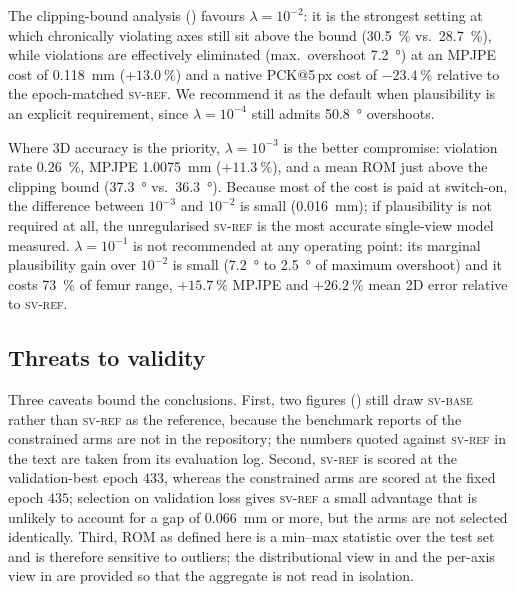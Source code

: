 \documentclass[11pt,a4paper]{article}
\newcommand{\lam}{\lambda}
\newcommand{\armref}{\textsc{sv-ref}}
\newcommand{\armbase}{\textsc{sv-base}}
\begin{document}
The clipping-bound analysis () favours $\lam = 10^{-2}$: it
is the strongest setting at which chronically violating axes still sit above
the bound (\SI{30.5}{\percent} vs.\ \SI{28.7}{\percent}), while violations are
effectively eliminated
(max.\ overshoot \SI{7.2}{\degree}) at an MPJPE cost of
\SI{0.118}{\milli\metre} ($+\SI{13.0}{\percent}$) and a native PCK@5\,px cost
of $-\SI{23.4}{\percent}$ relative to the epoch-matched \armref{}. We recommend
it as the default when plausibility is an explicit requirement, since
$\lam = 10^{-4}$ still admits \SI{50.8}{\degree} overshoots.

Where 3D accuracy is the priority, $\lam = 10^{-3}$ is the better compromise:
violation rate \SI{0.26}{\percent}, MPJPE \SI{1.0075}{\milli\metre}
($+\SI{11.3}{\percent}$), and a mean ROM just above the clipping bound
(\SI{37.3}{\degree} vs.\ \SI{36.3}{\degree}).
Because most of the cost is paid at switch-on, the difference between
$10^{-3}$ and $10^{-2}$ is small (\SI{0.016}{\milli\metre}); if plausibility is
not required at all, the unregularised \armref{} is the most accurate
single-view model measured. $\lam = 10^{-1}$ is not recommended at any
operating point: its marginal plausibility gain over $10^{-2}$ is small
(\SI{7.2}{\degree} to \SI{2.5}{\degree} of maximum overshoot) and it costs
\SI{73}{\percent} of femur range, $+\SI{15.7}{\percent}$ MPJPE and
$+\SI{26.2}{\percent}$ mean 2D error relative to \armref{}.

\subsection{Threats to validity}

Three caveats bound the conclusions. First, two figures
() still draw \armbase{} rather than \armref{} as the
reference, because the benchmark reports of the constrained arms are not in
the repository; the numbers quoted against \armref{} in the text are taken
from its evaluation log. Second, \armref{} is scored at the
validation-best epoch $433$, whereas the constrained arms are scored at the
fixed epoch $435$; selection on validation loss gives \armref{} a small
advantage that is unlikely to account for a gap of \SI{0.066}{\milli\metre} or
more, but the arms are not selected identically. Third, ROM as defined here is a min--max statistic
over the test set and is therefore sensitive to outliers; the distributional
view in  and the per-axis view in  are
provided so that the aggregate is not read in isolation.
\end{document}
